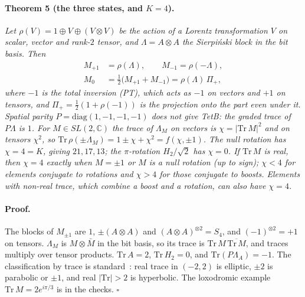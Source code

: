 \documentclass[twocolumn]{iopjournal}
\begin{document}
\paragraph{Theorem 5 (the three states, and $K = 4$).} \textit{Let
$\rho(V) = 1 \oplus V \oplus (V \otimes V)$ be the action of a Lorentz
transformation $V$ on scalar, vector and rank-$2$ tensor, and
$\Lambda = A \otimes A$ the Sierpi\'nski block in the bit basis. Then}
\begin{equation}
\begin{aligned}
  M_{+1} &= \rho(\Lambda), \qquad M_{-1} = \rho(-\Lambda),\\
  M_0 &= \tfrac12\big(M_{+1} + M_{-1}\big) = \rho(\Lambda)\,\Pi_+ ,
\end{aligned}
\end{equation}
\textit{where $-1$ is the total inversion (PT), which acts as $-1$ on
vectors and $+1$ on tensors, and $\Pi_+ = \tfrac12(1 + \rho(-1))$ is
the projection onto the part even under it. Spatial parity
$P = \mathrm{diag}(1,-1,-1,-1)$ does not give TetB: the graded trace of
$P\Lambda$ is $1$. For $M \in SL(2,\mathbb{C})$ the trace of $\Lambda_M$
on vectors is $\chi = |\mathrm{Tr}\,M|^2$ and on tensors $\chi^2$, so
$\mathrm{Tr}\,\rho(\pm\Lambda_M) = 1 \pm \chi + \chi^2 = f(\chi, \pm1)$.
The null rotation has $\chi = 4 = K$, giving $21, 17, 13$; the
$\pi$-rotation $H_2/\sqrt2$ has $\chi = 0$. If $\mathrm{Tr}\,M$ is real,
then $\chi = 4$ exactly when $M = \pm1$ or $M$ is a null rotation (up
to sign); $\chi < 4$ for elements conjugate to rotations and $\chi > 4$
for those conjugate to boosts. Elements with non-real trace, which
combine a boost and a rotation, can also have $\chi = 4$.}

\paragraph{Proof.} The blocks of $M_{\pm1}$ are $1$, $\pm(A\otimes A)$
and $(A\otimes A)^{\otimes 2} = S_4$, and $(-1)^{\otimes 2} = +1$ on
tensors. $\Lambda_M$ is $M \otimes \bar M$ in the bit basis, so its
trace is $\mathrm{Tr}\,M\,\overline{\mathrm{Tr}\,M}$, and traces
multiply over tensor products. $\mathrm{Tr}\,A = 2$,
$\mathrm{Tr}\,H_2 = 0$, and $\mathrm{Tr}(P\Lambda_A) = -1$. The
classification by trace is standard~\cite{Beardon1983}: real trace in
$(-2,2)$ is elliptic, $\pm2$ is parabolic or $\pm1$, and real
$|\mathrm{Tr}| > 2$ is hyperbolic. The loxodromic example
$\mathrm{Tr}\,M = 2e^{i\pi/3}$ is in the checks. \hfill $\square$
\end{document}
